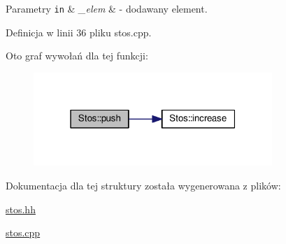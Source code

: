 \begin{DoxyParams}[1]{Parametry}
\mbox{\tt in}  & {\em \-\_\-elem} & -\/ dodawany element. \\
\hline
\end{DoxyParams}


Definicja w linii 36 pliku stos.\-cpp.



Oto graf wywołań dla tej funkcji\-:
\nopagebreak
\begin{figure}[H]
\begin{center}
\leavevmode
\includegraphics[width=256pt]{struct_stos_afd5802e405946328cccca3eed676b493_cgraph}
\end{center}
\end{figure}




Dokumentacja dla tej struktury została wygenerowana z plików\-:\begin{DoxyCompactItemize}
\item 
\hyperlink{stos_8hh}{stos.\-hh}\item 
\hyperlink{stos_8cpp}{stos.\-cpp}\end{DoxyCompactItemize}
